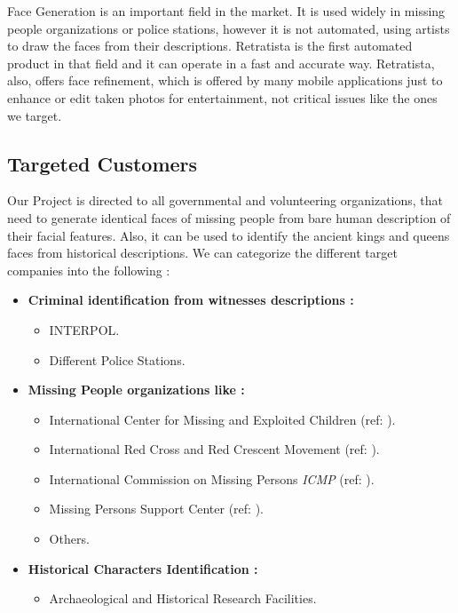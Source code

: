 Face Generation is an important field in the market. It is used widely in missing people organizations or police stations, however it is not automated, using artists to draw the faces from their descriptions. Retratista is the first automated product in that field and it can operate in a fast and accurate way. Retratista, also, offers face refinement, which is offered by many mobile applications just to enhance or edit taken photos for entertainment, not critical issues like the ones we target. 

\subsection{Targeted Customers}
Our Project is directed to all governmental and volunteering organizations, that need to generate identical faces of missing people from bare human description of their facial features.
Also, it can be used to identify the ancient kings and queens faces from historical descriptions.
We can categorize the different target companies into the following :
\begin{itemize}
    \item \textbf{Criminal identification from witnesses descriptions :}
        \begin{itemize}
            \item INTERPOL.
            \item Different Police Stations.
        \end{itemize}
    \item \textbf{Missing People organizations like :}
        \begin{itemize}
            \item International Center for Missing and Exploited Children (ref: ).
            \item International Red Cross and Red Crescent Movement (ref: ).
            \item International Commission on Missing Persons \emph{ICMP} (ref: ).
            \item Missing Persons Support Center (ref: ).
            \item Others.
        \end{itemize}
    \item \textbf{Historical Characters Identification :}
        \begin{itemize}
            \item Archaeological and Historical Research Facilities.
        \end{itemize}
\end{itemize}

